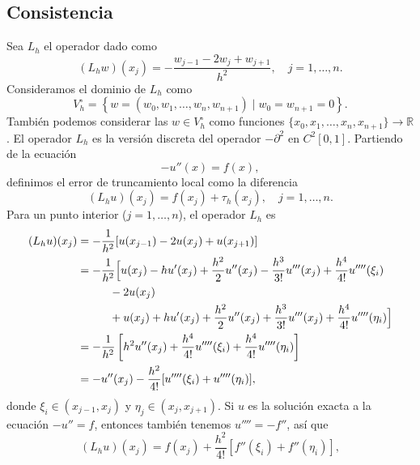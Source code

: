 \documentclass[11pt,letterpaper]{report}
\newcommand\R{\mathbb R}
\begin{document}
\subsection{Consistencia}

Sea $L_h$ el operador dado como
\begin{equation}
  (L_hw)(x_j)
  =
  -\frac{w_{j-1}-2w_j+w_{j+1}}{h^{2}}, \quad j=1,\dots,n
.\end{equation}
Consideramos el dominio de $L_h$ como
\begin{equation}
  V_{h}^{\circ} =
  \left\{
    w=(w_0,w_1,\dots,w_n,w_{n+1}) \mid w_0=w_{n+1}=0
  \right\}
.\end{equation}
También podemos considerar las $w\in V_h^{\circ}$ como funciones
$\{x_0,x_1,\dots,x_n,x_{n+1}\}\to\R$.
El operador $L_h$ es la versión discreta del operador $-\partial^{2}$
en $C^{2}[0,1]$. Partiendo de la ecuación
\begin{equation}
  -u''(x) = f(x)
,\end{equation}
definimos el error de truncamiento local como la diferencia
\begin{equation}
  (L_h u)(x_j) = f(x_j) + \tau_h(x_j), \quad j=1,\dots,n
.\end{equation}
Para un punto interior ($j=1,\dots,n$), el operador $L_h$ es
\begin{align}
  (L_hu)(x_j)
  &= -\frac{1}{h^{2}}[u(x_{j-1})-2u(x_j)+u(x_{j+1})] \\
  &= -\frac{1}{h^{2}}
  \Big[
    u(x_j)
    - hu'(x_j)
    + \frac{h^{2}}{2}u''(x_j)
    - \frac{h^{3}}{3!} u'''(x_j)
    + \frac{h^{4}}{4!}u''''(\xi_i)  \\
  &\hspace{10mm} - 2u(x_j) \\
  &\hspace{10mm}
    + u(x_j)
    + hu'(x_j)
    + \frac{h^{2}}{2}u''(x_j)
    + \frac{h^{3}}{3!} u'''(x_j)
    + \frac{h^{4}}{4!}u''''(\eta_i)
  \Big]
  \\
  &= -\frac{1}{h^{2}}
  \left[
    h^{2}u''(x_j)
    + \frac{h^{4}}{4!}u''''(\xi_i)
    + \frac{h^{4}}{4!}u''''(\eta_i)
  \right] \\
  &=
  -
    u''(x_j)
  -
    \frac{h^{2}}{4!} [ u''''(\xi_i) + u''''(\eta_i) ]
,\end{align}
donde $\xi_i\in(x_{j-1},x_{j})$ y $\eta_j\in(x_{j},x_{j+1})$.
Si $u$ es la solución exacta a la ecuación $-u''=f$, entonces también
tenemos $u''''=-f''$, así que
\begin{equation}
  (L_hu)(x_j)
  =
  f(x_j) + \frac{h^{2}}{4!} [ f''(\xi_i) + f''(\eta_i) ]
,\end{equation}
\end{document}
